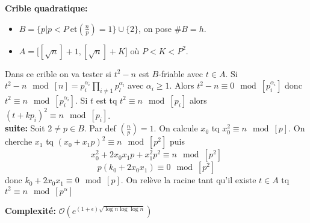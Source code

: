 \documentclass[12pt]{article}
\theoremstyle{plain}
\theoremstyle{definition}
\newcommand{\Or}{\mathcal{O}}
\begin{document}
\noindent \textbf{Crible quadratique:}
\begin{itemize}
    \item $B=\{p| p<P~\text{et}
\left(\frac{n}{p}\right)=1\}\cup\{2\}$, on pose $\#B=h$.
    \item $A=\big[[\sqrt{n}]+1,[\sqrt{n}]+K\big]$ où
$P<K<P^2$.
\end{itemize}
Dans ce crible on va tester si $t^2 - n$ est $B$-friable 
avec $t\in A$. Si $t^2-n\mod[n]=p_i^{\alpha_i}
\prod_{i\ne1}p_l^{\alpha_l}$ avec $\alpha_i\geq 1$. Alors 
$t^2-n\equiv 0 \mod[p_i^{\alpha_i}]$ donc $t^2\equiv n\mod[p_i^{\alpha_i}]$.
Si $t$ est tq $t^2\equiv n\mod[p_i]$ alors $(t+kp_i)^2\equiv n \mod[p_i]$.\\

\noindent \textbf{suite:} Soit $2\ne p\in B$. Par def $\left(\frac{n}{p}\right)=1$.
On calcule $x_0$ tq $x_0^2\equiv n\mod[p]$. On cherche 
$x_1$ tq $(x_0+x_1p)^2\equiv n\mod[p^2]$ puis 
\[
    x_0^2+2x_0x_1p+x_1^2p^2\equiv n\mod[p^2]
\]
\[
    p(k_0+2x_0x_1)\equiv0\mod[p^2]
\]
donc $k_0+2x_0x_1\equiv 0\mod[p]$. On relève la racine 
tant qu'il existe $t\in A$ tq $t^2\equiv n\mod[p^{\alpha}]$

\textbf{Complexité:} \(\Or(e^{(1+\epsilon)\sqrt{\log n \log\log n}})\)

\subsection{}
\end{document}
